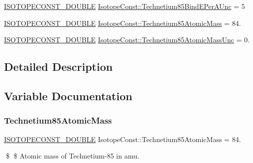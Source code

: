 \begin{DoxyCompactItemize}
\mbox{\hyperlink{group___isotope_const-_macros_ga8f45a7272ce02c0b4c65c44636ed719a}{I\+S\+O\+T\+O\+P\+E\+C\+O\+N\+S\+T\+\_\+\+D\+O\+U\+B\+LE}} \mbox{\hyperlink{group___isotope_const-_technetium-_tc85_ga91974107ac53472291f5059c012d827a}{Isotope\+Const\+::\+Technetium85\+Bind\+E\+Per\+A\+Unc}} = 5
\item 
\mbox{\hyperlink{group___isotope_const-_macros_ga8f45a7272ce02c0b4c65c44636ed719a}{I\+S\+O\+T\+O\+P\+E\+C\+O\+N\+S\+T\+\_\+\+D\+O\+U\+B\+LE}} \mbox{\hyperlink{group___isotope_const-_technetium-_tc85_ga679f32efa99bf588301b51fad1c2fa5c}{Isotope\+Const\+::\+Technetium85\+Atomic\+Mass}} = 84.
\item 
\mbox{\hyperlink{group___isotope_const-_macros_ga8f45a7272ce02c0b4c65c44636ed719a}{I\+S\+O\+T\+O\+P\+E\+C\+O\+N\+S\+T\+\_\+\+D\+O\+U\+B\+LE}} \mbox{\hyperlink{group___isotope_const-_technetium-_tc85_ga73154fd32183f7e388e22d7423331e47}{Isotope\+Const\+::\+Technetium85\+Atomic\+Mass\+Unc}} = 0.
\end{DoxyCompactItemize}


\subsection{Detailed Description}


\subsection{Variable Documentation}
\mbox{\label{group___isotope_const-_technetium-_tc85_ga679f32efa99bf588301b51fad1c2fa5c}} 
\subsubsection{\texorpdfstring{Technetium85\+Atomic\+Mass}{Technetium85AtomicMass}}
{\footnotesize\ttfamily \mbox{\hyperlink{group___isotope_const-_macros_ga8f45a7272ce02c0b4c65c44636ed719a}{I\+S\+O\+T\+O\+P\+E\+C\+O\+N\+S\+T\+\_\+\+D\+O\+U\+B\+LE}} Isotope\+Const\+::\+Technetium85\+Atomic\+Mass = 84.}

\$ \$ Atomic mass of Technetium-\/85 in amu. \mbox{\label{group___isotope_const-_technetium-_tc85_ga73154fd32183f7e388e22d7423331e47}} 
